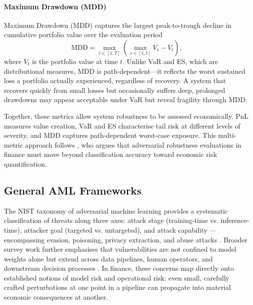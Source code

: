 \paragraph{Maximum Drawdown (MDD)}
Maximum Drawdown (MDD) captures the largest peak-to-trough decline in cumulative portfolio value over the evaluation period
\begin{equation}
\mathrm{MDD} = \max_{t \in [1,T]} \left( \max_{s \in [1,t]} V_s - V_t \right),
\end{equation}
where $V_t$ is the portfolio value at time $t$. Unlike VaR and ES, which are distributional measures, MDD is path-dependent—it reflects the worst sustained loss a portfolio actually experienced, regardless of recovery. A system that recovers quickly from small losses but occasionally suffers deep, prolonged drawdowns may appear acceptable under VaR but reveal fragility through MDD.

Together, these metrics allow system robustness to be assessed economically. PnL measures value creation, VaR and ES characterise tail risk at different levels of severity, and MDD captures path-dependent worst-case exposure. This multi-metric approach follows \cite{baviskar2025robust}, who argues that adversarial robustness evaluations in finance must move beyond classification accuracy toward economic risk quantification.

\subsection{General AML Frameworks}
The NIST taxonomy of adversarial machine learning provides a systematic classification of threats along three axes: attack stage (training-time vs. inference-time), attacker goal (targeted vs. untargeted), and attack capability — encompassing evasion, poisoning, privacy extraction, and abuse attacks \cite{vassilev2023nist}. Broader survey work further emphasises that vulnerabilities are not confined to model weights alone but extend across data pipelines, human operators, and downstream decision processes \cite{pelekis_adversarial_2025-1}. In finance, these concerns map directly onto established notions of model risk and operational risk: even small, carefully crafted perturbations at one point in a pipeline can propagate into material economic consequences at another.

